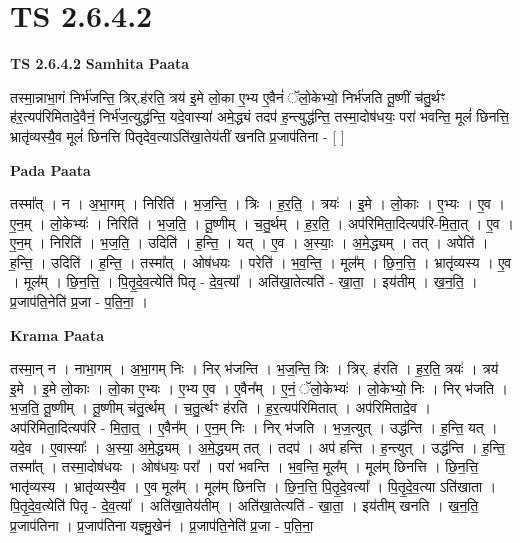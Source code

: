 \documentclass[17pt]{extarticle}
\begin{document}
\section*{ TS 2.6.4.2 }

\textbf{TS 2.6.4.2 } \newline
\textbf{Samhita Paata} \newline

तस्मा॒न्नाभा॒गं निर्भ॑जन्ति॒ त्रिर्.ह॑रति॒ त्रय॑ इ॒मे लो॒का ए॒भ्य ए॒वैनं॑ ॅलो॒केभ्यो॒ निर्भ॑जति तू॒ष्णीं च॑तु॒र्थꣳ ह॑र॒त्यप॑रिमितादे॒वैनं॒ निर्भ॑ज॒त्युद्ध॑न्ति॒ यदे॒वास्या॑ अमे॒द्ध्यं तदप॑ ह॒न्त्युद्ध॑न्ति॒ तस्मा॒दोष॑धयः॒ परा॑ भवन्ति॒ मूलं॑ छिनत्ति॒ भ्रातृ॑व्यस्यै॒व मूलं॑ छिनत्ति पितृदेव॒त्याऽति॑खा॒तेय॑तीं खनति प्र॒जाप॑तिना - [  ] \newline

\textbf{Pada Paata} \newline

तस्मा᳚त् । न । अ॒भा॒गम् । निरिति॑ । भ॒ज॒न्ति॒ । त्रिः । ह॒र॒ति॒ । त्रयः॑ । इ॒मे । लो॒काः । ए॒भ्यः । ए॒व । ए॒न॒म् । लो॒केभ्यः॑ । निरिति॑ । भ॒ज॒ति॒ । तू॒ष्णीम् । च॒तु॒र्थम् । ह॒र॒ति॒ । अप॑रिमिता॒दित्यप॑रि-मि॒ता॒त् । ए॒व । ए॒न॒म् । निरिति॑ । भ॒ज॒ति॒ । उदिति॑ । ह॒न्ति॒ । यत् । ए॒व । अ॒स्याः॒ । अ॒मे॒द्ध्यम् । तत् । अपेति॑ । ह॒न्ति॒ । उदिति॑ । ह॒न्ति॒ । तस्मा᳚त् । ओष॑धयः । परेति॑ । भ॒व॒न्ति॒ । मूल᳚म् । छि॒न॒त्ति॒ । भ्रातृ॑व्यस्य । ए॒व । मूल᳚म् । छि॒न॒त्ति॒ । पि॒तृ॒दे॒व॒त्येति॑ पितृ - दे॒व॒त्या᳚ । अति॑खा॒तेत्यति॑ - खा॒ता॒ । इय॑तीम् । ख॒न॒ति॒ । प्र॒जाप॑ति॒नेति॑ प्र॒जा - प॒ति॒ना॒ ।  \newline


\textbf{Krama Paata} \newline

तस्मा॒न् न । नाभा॒गम् । अ॒भा॒गम् निः । निर् भ॑जन्ति । भ॒ज॒न्ति॒ त्रिः । त्रिर्. ह॑रति । ह॒र॒ति॒ त्रयः॑ । त्रय॑ इ॒मे । इ॒मे लो॒काः । लो॒का ए॒भ्यः । ए॒भ्य ए॒व । ए॒वैन᳚म् । ए॒नं॒ ॅलो॒केभ्यः॑ । लो॒केभ्यो॒ निः । निर् भ॑जति । भ॒ज॒ति॒ तू॒ष्णीम् । तू॒ष्णीम् च॑तु॒र्त्थम् । च॒तु॒र्त्थꣳ ह॑रति । ह॒र॒त्यप॑रिमितात् । अप॑रिमितादे॒व । अप॑रिमिता॒दित्यप॑रि - मि॒ता॒त्॒ । ए॒वैन᳚म् । ए॒न॒म् निः । निर् भ॑जति । भ॒ज॒त्युत् । उद्ध॑न्ति । ह॒न्ति॒ यत् । यदे॒व । ए॒वास्याः᳚ । अ॒स्या॒ अ॒मे॒द्ध्यम् । अ॒मे॒द्ध्यम् तत् । तदप॑ । अप॑ हन्ति । ह॒न्त्युत् । उद्ध॑न्ति । ह॒न्ति॒ तस्मा᳚त् । तस्मा॒दोष॑धयः । ओष॑धयः॒ परा᳚ । परा॑ भवन्ति । भ॒व॒न्ति॒ मूल᳚म् । मूल॑म् छिनत्ति । छि॒न॒त्ति॒ भातृ॑व्यस्य । भ्रातृ॑व्यस्यै॒व । ए॒व मूल᳚म् । मूल॑म् छिनत्ति । छि॒न॒त्ति॒ पि॒तृ॒दे॒वत्या᳚ । पि॒तृ॒दे॒व॒त्या ऽति॑खाता । पि॒तृ॒दे॒व॒त्येति॑ पितृ - दे॒व॒त्या᳚ । अति॑खा॒तेय॑तीम् । अति॑खा॒तेत्यति॑ - खा॒ता॒ । इय॑तीम् खनति । ख॒न॒ति॒ प्र॒जाप॑तिना । प्र॒जाप॑तिना यज्ञ्मु॒खेन॑ । प्र॒जाप॑ति॒नेति॑ प्र॒जा - प॒ति॒ना॒ \newline
\end{document}
